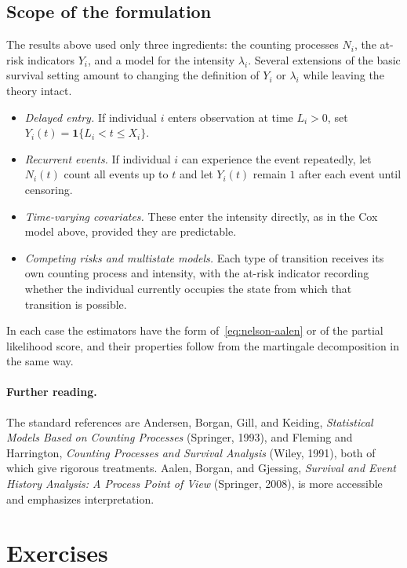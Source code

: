 \documentclass[11pt]{article}
\theoremstyle{definition}
\theoremstyle{plain}
\begin{document}
\subsection{Scope of the formulation}

The results above used only three ingredients: the counting processes $N_i$, the at-risk indicators $Y_i$, and a model for the intensity $\lambda_i$. Several extensions of the basic survival setting amount to changing the definition of $Y_i$ or $\lambda_i$ while leaving the theory intact.
\begin{itemize}
  \item \emph{Delayed entry.} If individual $i$ enters observation at time $L_i > 0$, set $Y_i(t) = \mathbf{1}\{L_i < t \le X_i\}$.
  \item \emph{Recurrent events.} If individual $i$ can experience the event repeatedly, let $N_i(t)$ count all events up to $t$ and let $Y_i(t)$ remain $1$ after each event until censoring.
  \item \emph{Time-varying covariates.} These enter the intensity directly, as in the Cox model above, provided they are predictable.
  \item \emph{Competing risks and multistate models.} Each type of transition receives its own counting process and intensity, with the at-risk indicator recording whether the individual currently occupies the state from which that transition is possible.
\end{itemize}
In each case the estimators have the form of~\eqref{eq:nelson-aalen} or of the partial likelihood score, and their properties follow from the martingale decomposition in the same way.

\paragraph{Further reading.} The standard references are Andersen, Borgan, Gill, and Keiding, \emph{Statistical Models Based on Counting Processes} (Springer, 1993), and Fleming and Harrington, \emph{Counting Processes and Survival Analysis} (Wiley, 1991), both of which give rigorous treatments. Aalen, Borgan, and Gjessing, \emph{Survival and Event History Analysis: A Process Point of View} (Springer, 2008), is more accessible and emphasizes interpretation.

\section*{Exercises}
\end{document}
